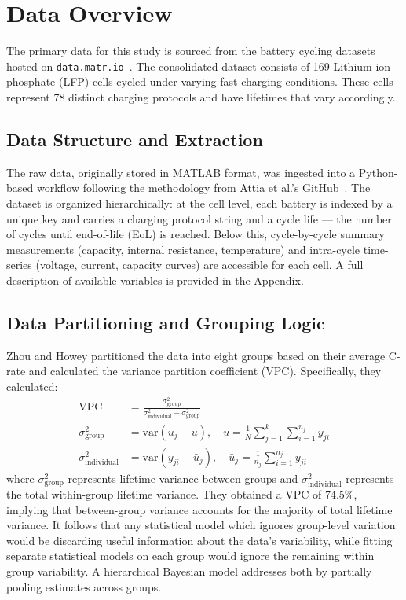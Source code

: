 \section{Data Overview} \label{sec:dataoverview}
The primary data for this study is sourced from the battery cycling datasets hosted on \texttt{data.matr.io}~\cite{Matrdata}.
The consolidated dataset consists of 169 Lithium-ion phosphate (LFP) cells cycled under varying fast-charging conditions. These cells represent 78 distinct charging protocols and have lifetimes that vary accordingly.

\subsection{Data Structure and Extraction}
The raw data, originally stored in MATLAB format, was ingested into a Python-based workflow following the methodology from Attia et al.'s GitHub~\cite{Braatz2019github}. 
The dataset is organized hierarchically: at the cell level, each battery is indexed by a unique key and carries a charging protocol string and a cycle life — the number of cycles until end-of-life (EoL) is reached. 
Below this, cycle-by-cycle summary measurements (capacity, internal resistance, temperature) and intra-cycle time-series (voltage, current, capacity curves) are accessible for each cell. 
A full description of available variables is provided in the Appendix.

\subsection{Data Partitioning and Grouping Logic}\label{sec:groupinglogic}
Zhou and Howey \cite{ZHOU20236117} partitioned the data into eight groups based on their average C-rate and calculated the variance partition coefficient (VPC). Specifically, they calculated:
\begin{align*}
\text{VPC} &= \frac{\sigma^2_{\text{group}}}{\sigma^2_{\text{individual}} + \sigma^2_{\text{group}}} \\
\sigma^2_{\text{group}} &= \text{var}\left(\bar{u}_j - \bar{u}\right), \quad \bar{u} = \frac{1}{N} \sum_{j=1}^{k} \sum_{i=1}^{n_j} y_{ji} \\
\sigma^2_{\text{individual}} &= \text{var}\left(y_{ji} - \bar{u}_j\right), \quad \bar{u}_j = \frac{1}{n_j} \sum_{i=1}^{n_j} y_{ji}
\end{align*}
where $\sigma^2_{\text{group}}$ represents lifetime variance between groups and $\sigma^2_{\text{individual}}$ represents the total within-group lifetime variance. 
They obtained a VPC of 74.5\%, implying that between-group variance accounts for the majority of total lifetime variance. It follows that any statistical model which ignores group-level
variation would be discarding useful information about the data's variability, while fitting separate statistical models on each group would ignore the remaining within group variability.
A hierarchical Bayesian model addresses both by partially pooling estimates across groups.

